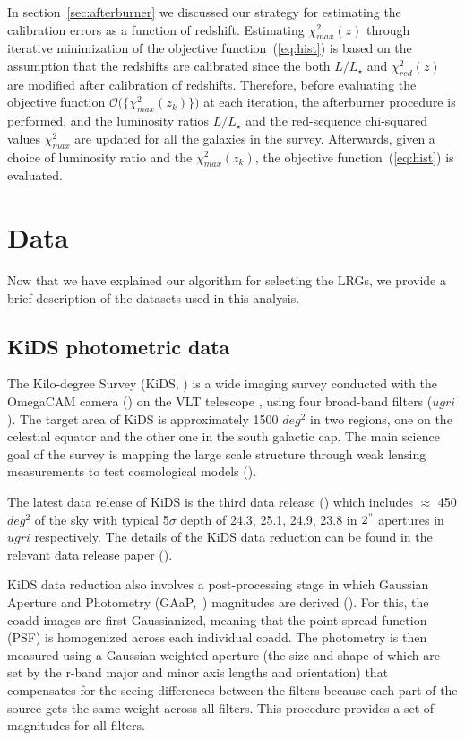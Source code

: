 \documentclass[fleqn,usenatbib]{mnras}
\begin{document}
In section~\ref{sec:afterburner} we discussed our strategy for estimating the calibration errors as a 
function of redshift. Estimating $\chi^{2}_{max}(z)$ through iterative minimization of the objective function~(\ref{eq:hist}) is based on the assumption that the redshifts are calibrated since the both $L/L_{\star}$ and $\chi^{2}_{red}(z)$ are modified after calibration of redshifts. Therefore, before evaluating the objective function $\mathcal{O}\big(\{\chi^{2}_{max}(z_k)\}\big)$ at each iteration, the afterburner procedure is performed, and the luminosity ratios $L/L_{\star}$ and the red-sequence chi-squared values $\chi^{2}_{max}$ are updated for all the galaxies in the survey. Afterwards, given a choice of luminosity ratio and the $\chi^{2}_{max}(z_k)$, the objective function~(\ref{eq:hist}) is evaluated. 

\section{Data}\label{sec:data}
Now that we have explained our algorithm for selecting the LRGs, we provide a brief description of the datasets 
used in this analysis. 
\subsection{KiDS photometric data}\label{sec:kids}
The Kilo-degree Survey (KiDS, \citealt{kids}) is a wide 
imaging survey conducted with the OmegaCAM camera (\citealt{omegacam}) on the VLT telescope \citealt{vlt}, using four broad-band filters ($ugri$). The target area of KiDS is approximately 1500 $deg^{2}$ in two regions, one on the celestial equator and the other one in the south galactic cap. The main science goal of the survey is mapping the large scale structure through weak lensing measurements to test cosmological models (\citealt{hendrick2017,joudaki2017,joudaki2018,edo2018}).

The latest data release of KiDS is the third data release (\citealt{kids_dr3}) which includes $\approx$ 450 $deg^{2}$ of the sky with typical 5$\sigma$ depth of 24.3, 25.1, 24.9, 23.8 in $2^{"}$ apertures in $ugri$ respectively. The details of the KiDS data reduction can be found in the relevant data release paper (\citealt{kids_dr3}). 

KiDS data reduction also involves a post-processing stage in which Gaussian Aperture and Photometry (GAaP,~\citealt{gaap}) magnitudes are derived (\citealt{kuijken2015}). For this, the coadd images are first Gaussianized, meaning that the point spread function (PSF) is homogenized across each individual coadd. The photometry is then measured using a Gaussian-weighted aperture (the size and shape of which are set by the r-band major and minor axis lengths and orientation) that compensates for the seeing differences between the filters because each part of the source gets the same weight across all filters. This procedure provides a set of magnitudes for all filters. 
\end{document}
